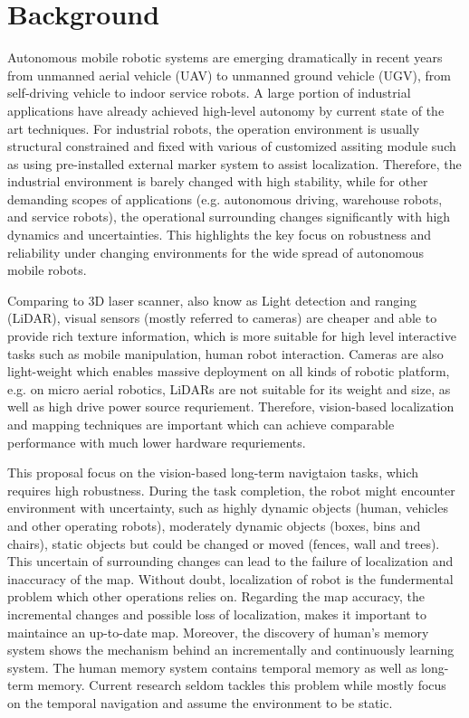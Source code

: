 \section{Background}
Autonomous mobile robotic systems are emerging dramatically in recent years from
unmanned aerial vehicle (UAV) to unmanned ground vehicle (UGV), from self-driving
vehicle to indoor service robots. A large portion of industrial applications have
already achieved high-level autonomy by current state of the art techniques. 
For industrial robots, the operation environment is usually structural constrained 
and fixed with various of customized assiting module such as using pre-installed 
external marker system to assist localization. 
Therefore, the industrial environment is barely changed with high stability, 
while for other demanding scopes of applications (e.g. autonomous driving, warehouse robots,
and service robots), the operational surrounding changes significantly with high dynamics
and uncertainties. This highlights the key focus on robustness and reliability under
changing environments for the wide spread of autonomous mobile robots. 

Comparing to 3D laser scanner, also know as Light detection and ranging (LiDAR), 
visual sensors (mostly referred to cameras) are cheaper and able to provide rich
texture information, which is more suitable for high level interactive tasks such
as mobile manipulation, human robot interaction. Cameras are also light-weight which enables massive deployment on all kinds of robotic platform, e.g. on micro aerial 
robotics, LiDARs are not suitable for its weight and size, as well as high drive power source requriement. Therefore, vision-based localization and mapping techniques are 
important which can achieve comparable performance with much lower hardware requriements.

This proposal focus on the vision-based long-term navigtaion tasks, which requires 
high robustness. During the task completion, the robot might encounter environment with uncertainty, such as highly dynamic objects (human, vehicles and other operating robots), moderately dynamic objects (boxes, bins and chairs), static objects but could be changed or moved (fences, wall and trees). This uncertain of surrounding changes 
can lead to the failure of localization and inaccuracy of the map. Without doubt, localization of robot is the fundermental problem which other operations relies on.
Regarding the map accuracy, the incremental changes and possible loss of localization, makes it important to maintaince an up-to-date map. Moreover, the discovery of human's memory system shows the mechanism behind an incrementally and continuously learning system. The human memory system contains temporal memory as well as long-term memory. Current research seldom tackles this problem while mostly focus on the temporal navigation and assume the environment to be static. 
\cite{yin2022bioslam}


